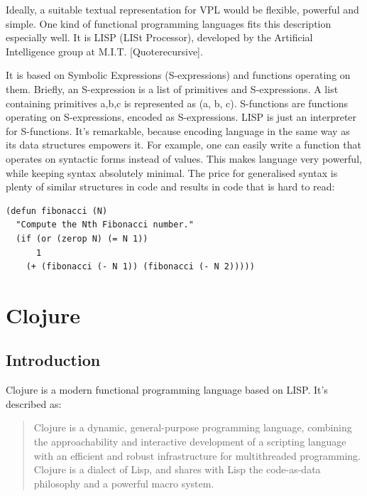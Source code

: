 \documentclass[11pt]{scrartcl}
\begin{document}
Ideally, a suitable textual representation for VPL would be flexible, powerful and simple.
One kind of functional programming languages fits this description especially well. It is LISP (LISt Processor), developed by the Artificial Intelligence group at M.I.T. [Quote{recursive}].

It is based on Symbolic Expressions (S-expressions) and functions operating on them. Briefly, an S-expression is a list of primitives and S-expressions. A list containing primitives a,b,c is represented as (a, b, c). S-functions are functions operating on S-expressions, encoded as S-expressions. LISP is just an interpreter for S-functions. It’s remarkable, because encoding language in the same way as its data structures empowers it. For example, one can easily write a function that operates on syntactic forms instead of values. This makes language very powerful, while keeping syntax absolutely minimal. The price for generalised syntax is plenty of similar structures in code and results in code that is hard to read:
\begin{lstlisting}
(defun fibonacci (N)
  "Compute the Nth Fibonacci number."
  (if (or (zerop N) (= N 1))
      1
    (+ (fibonacci (- N 1)) (fibonacci (- N 2)))))
\end{lstlisting}

\section{Clojure}
\subsection{Introduction}
Clojure is a modern functional programming language based on LISP. It’s described as:
\blockquote[{\cite{clojure_website}}]{Clojure is a dynamic, general-purpose programming language, combining the approachability and interactive development of a scripting language with an efficient and robust infrastructure for multithreaded programming. Clojure is a dialect of Lisp, and shares with Lisp the code-as-data philosophy and a powerful macro system.}
\end{document}
